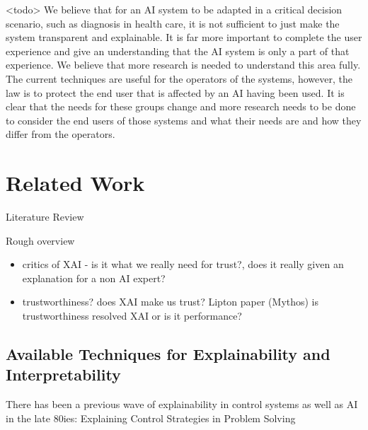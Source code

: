 \documentclass[manuscript,screen,review]{acmart}
\begin{document}
<todo> We believe that for an AI system to be adapted in a critical decision scenario, such as diagnosis in health care, it is not sufficient to just make the system transparent and explainable. It is far more important to complete the user experience and give an understanding that the AI system is only a part of that experience. We believe that more research is needed to understand this area fully.\\
The current techniques are useful for the operators of the systems, however, the law is to protect the end user that is affected by an AI having been used. It is clear that the needs for these groups change and more research needs to be done to consider the end users of those systems and what their needs are and how they differ from the operators.\\


\section{Related Work}
Literature Review

Rough overview
\begin{itemize}
    \item critics of XAI - is it what we really need for trust?, does it really given an explanation for a non AI expert? 
    \item trustworthiness? does XAI make us trust? Lipton paper (Mythos) is trustworthiness resolved XAI or is it performance?
\end{itemize}

\subsection{Available Techniques for Explainability and Interpretability}
There has been a previous wave of explainability in control systems as well as AI in the late 80ies: Explaining Control Strategies in Problem Solving\cite{Chandrasekaran1989}
\end{document}
